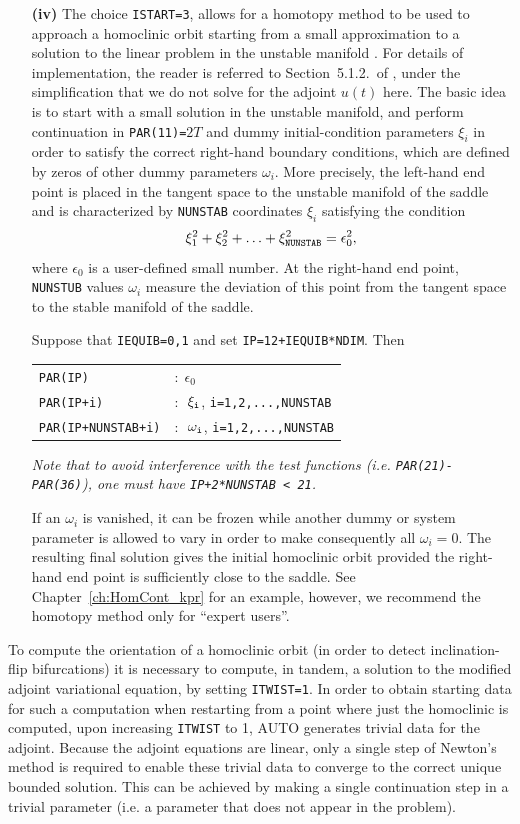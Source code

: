\documentclass[12pt]{report}
\def\eps{\epsilon}
\begin{document}
\begin{itemize}
\item[{\bf(iv)}]
The choice {\tt ISTART=3}, allows for
a homotopy method to be used to approach a homoclinic orbit
starting from a small approximation to a solution to the 
linear problem in the unstable manifold \cite{DoFrMo:93}. For
details of implementation, the reader is referred to 
Section~5.1.2.\ of , under the simplification
that we do not solve for the adjoint $u(t)$ here. The basic idea
is to start with a small solution in the unstable manifold, and perform
continuation in {\tt PAR(11)=}$2T$ and dummy initial-condition 
parameters $\xi_i$ in order to satisfy the correct right-hand boundary
conditions, which are defined by zeros of other dummy parameters
$\omega_i$. More precisely, the left-hand end point is placed in the
tangent space to the unstable manifold of the saddle and is characterized by
{\tt NUNSTAB} coordinates $\xi_i$ satisfying the condition
$$
\xi_1^2 + \xi_2^2 + \ldots +\xi_{\tt NUNSTAB}^2  = \eps_0^2,
$$
where $\eps_0$ is a user-defined small number.
At the right-hand end point, {\tt NUNSTUB} values $\omega_i$ 
measure the deviation of this point from the tangent
space to the stable manifold of the saddle. 
\par
Suppose that {\tt IEQUIB=0,1} and set {\tt IP=12+IEQUIB*NDIM}. Then
\par
\medskip
\begin{center}
\begin{tabular}{ll}
{\tt PAR(IP)} & :$\ \ \eps_0$\\
{\tt PAR(IP+i)} &  :$\ \ \xi_{\tt i}$, {\tt i=1,2,...,NUNSTAB}\\
{\tt PAR(IP+NUNSTAB+i)} & :$\ \ \omega_{\tt i}$, {\tt i=1,2,...,NUNSTAB}
\end{tabular}
\end{center}
\par
\medskip
{\it Note that to avoid interference with the test functions 
(i.e. {\tt PAR(21)-PAR(36)}), one must have {\tt IP+2*NUNSTAB < 21}.} 
\par
If an $\omega_i$ is vanished, it can be frozen while another dummy or system parameter is allowed to
vary in order to make consequently all $\omega_i=0$. The resulting final solution
gives the initial homoclinic orbit provided the right-hand end point
is sufficiently close to the saddle. 
See Chapter~\ref{ch:HomCont_kpr} for an example, 
however, we recommend the homotopy method only for ``expert users''.
\end{itemize}

To compute the orientation of a homoclinic orbit (in order to detect
inclination-flip bifurcations) it is necessary to compute, in tandem,
a solution to the modified adjoint variational equation, by setting
{\tt ITWIST=1}. In order to obtain starting data for such a
computation when restarting from a point where just the homoclinic
is computed, upon increasing {\tt ITWIST} to 1, {\cal AUTO} generates
trivial data for the adjoint. Because the adjoint equations are
linear, only a single step of Newton's method is required to
enable these trivial data to converge to the correct unique bounded
solution. This can be achieved by making a single continuation step in a
trivial parameter (i.e. a parameter that does not appear
in the problem). 
\end{document}
